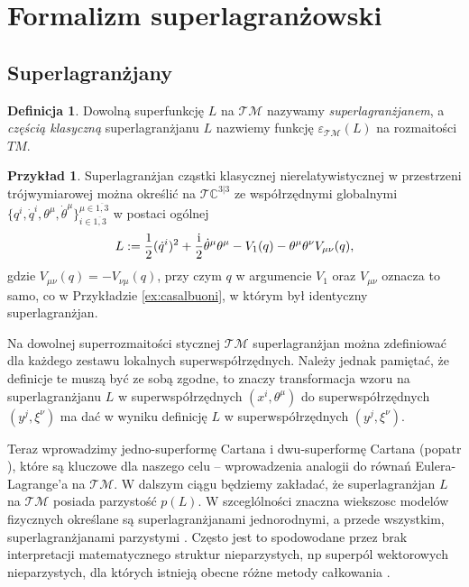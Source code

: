 \documentclass[11pt,a4paper]{report}
\theoremstyle{definition}
\newtheorem{example}[theorem]{Przykład}
\newtheorem{definition}[theorem]{Definicja}
\begin{document}
\section{Formalizm superlagranżowski}
			      				
\subsection{Superlagranżjany}
			      				
\begin{definition}
	Dowolną superfunkcję $L$ na $\mathcal{TM}$ nazywamy \textit{superlagranżjanem}, a
	\textit{częścią klasyczną} superlagranżjanu $L$ nazwiemy funkcję $\varepsilon_{\mathcal{T} \mathcal{M}} (L)$ na rozmaitości $TM$.
\end{definition}
			      				
\begin{example}
	Superlagranżjan cząstki klasycznej nierelatywistycznej w przestrzeni trójwymiarowej można określić na $\mathcal{T}\mathbb{C}^{3|3}$ ze współrzędnymi globalnymi $\{ q^i, \dot q^i, \theta^\mu, \dot \theta^\mu \}^{\mu \in \overline{1,3}}_{i\in \overline{1,3}}$ w postaci ogólnej
	\begin{equation}
		L:= \frac12  (\dot{q}^i)^2+\frac{\rm i}2\dot\theta^\mu\theta^\mu-V_1({q})-\theta^\mu \theta^\nu V_{\mu \nu}({q}),
	\end{equation}
	gdzie $V_{\mu \nu} (q) = - V_{\nu \mu} ({q})$, przy czym $q$ w argumencie $V_1$ oraz $V_{\mu \nu}$ oznacza to samo, co w Przykładzie \ref{ex:casalbuoni}, w którym był identyczny superlagranżjan.
\end{example}
			      				
Na dowolnej superrozmaitości stycznej $\mathcal{T} \mathcal{M}$ superlagranżjan można zdefiniować dla każdego zestawu lokalnych superwspółrzędnych. Należy jednak pamiętać, że definicje te muszą być ze sobą zgodne, to znaczy transformacja wzoru na superlagranżjanu $L$ w superwspółrzędnych $(x^i, \theta^\mu)$ do superwspółrzędnych $(y^j, \xi^\nu)$ ma dać w wyniku definicję $L$ w superwspółrzędnych $(y^j, \xi^\nu)$.
			      				
Teraz wprowadzimy jedno-superformę Cartana i dwu-superformę Cartana (popatr \cite{carinena,So99}), które są kluczowe dla naszego celu -- wprowadzenia analogii do równań Eulera-Lagrange'a na $\mathcal{TM}$. W dalszym ciągu będziemy zakładać, że superlagranżjan $L$ na $\mathcal{TM}$ posiada parzystość $p(L)$. W szceglólności znaczna wiekszosc modelów fizycznych określane są superlagranżjanami jednorodnymi, a przede wszystkim, superlagranżjanami parzystymi \cite{Be77,casalbuoni,Ga80}. Często jest to spodowodane przez brak interpretacji matematycznego struktur nieparzystych, np superpól wektorowych nieparzystych, dla których istnieją obecne różne metody całkowania \cite{BGM06,monterde}.
			      				
\end{document}
